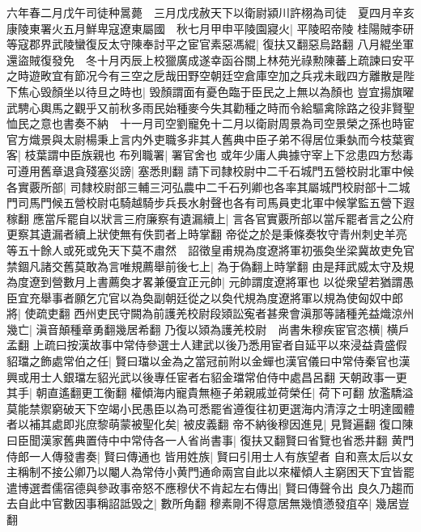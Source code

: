 六年春二月戊午司徒种暠薨　三月戊戌赦天下以衛尉潁川許栩為司徒　夏四月辛亥康陵東署火五月鮮卑寇遼東屬國　秋七月甲申平陵園寢火|{
	平陵昭帝陵}
桂陽賊李研等寇郡界武陵蠻復反太守陳奉討平之宦官素惡馮緄|{
	復扶又翻惡烏路翻}
八月緄坐軍還盜賊復發免　冬十月丙辰上校獵廣成遂幸函谷關上林苑光祿勲陳蕃上疏諫曰安平之時遊畋宜有節况今有三空之戹哉田野空朝廷空倉庫空加之兵戎未戢四方離散是陛下焦心毁顏坐以待旦之時也|{
	毁顏謂面有憂色臨于臣民之上無以為顏也}
豈宜揚旗曜武騁心輿馬之觀乎又前秋多雨民始種麥今失其勸種之時而令給驅禽除路之役非賢聖恤民之意也書奏不納　十一月司空劉寵免十二月以衛尉周景為司空景榮之孫也時宦官方熾景與太尉楊秉上言内外吏職多非其人舊典中臣子弟不得居位秉埶而今枝葉賓客|{
	枝葉謂中臣族親也}
布列職署|{
	署官舍也}
或年少庸人典據守宰上下忿患四方愁毒可遵用舊章退貪殘塞災謗|{
	塞悉則翻}
請下司隸校尉中二千石城門五營校尉北軍中候各實覈所部|{
	司隸校尉部三輔三河弘農中二千石列卿也各率其屬城門校尉部十二城門司馬門候五營校尉屯騎越騎步兵長水射聲也各有司馬員吏北軍中候掌監五營下遐稼翻}
應當斥罷自以狀言三府廉察有遺漏續上|{
	言各官實覈所部以當斥罷者言之公府更察其遺漏者續上狀使無有佚罰者上時掌翻}
帝從之於是秉條奏牧守青州刺史羊亮等五十餘人或死或免天下莫不肅然　詔徵皇甫規為度遼將軍初張奐坐梁冀故吏免官禁錮凡諸交舊莫敢為言唯規薦舉前後七上|{
	為于偽翻上時掌翻}
由是拜武威太守及規為度遼到營數月上書薦奐才畧兼優宜正元帥|{
	元帥謂度遼將軍也}
以從衆望若猶謂愚臣宜充舉事者願乞宂官以為奐副朝廷從之以奐代規為度遼將軍以規為使匈奴中郎將|{
	使疏吏翻}
西州吏民守闕為前護羌校尉段熲訟寃者甚衆會滇那等諸種羌益熾涼州幾亡|{
	滇音顛種章勇翻幾居希翻}
乃復以熲為護羌校尉　尚書朱穆疾宦官恣横|{
	横戶孟翻}
上疏曰按漢故事中常侍參選士人建武以後乃悉用宦者自延平以來浸益貴盛假貂璫之飾處常伯之任|{
	賢曰璫以金為之當冠前附以金蟬也漢官儀曰中常侍秦官也漢興或用士人銀璫左貂光武以後專任宦者右貂金璫常伯侍中處昌呂翻}
天朝政事一更其手|{
	朝直遙翻更工衡翻}
權傾海内寵貴無極子弟親戚並荷榮任|{
	荷下可翻}
放濫驕溢莫能禁禦窮破天下空竭小民愚臣以為可悉罷省遵復往初更選海内清淳之士明達國體者以補其處即兆庶黎萌蒙被聖化矣|{
	被皮義翻}
帝不納後穆因進見|{
	見賢遍翻}
復口陳曰臣聞漢家舊典置侍中中常侍各一人省尚書事|{
	復扶又翻賢曰省覽也省悉井翻}
黄門侍郎一人傳發書奏|{
	賢曰傳通也}
皆用姓族|{
	賢曰引用士人有族望者}
自和熹太后以女主稱制不接公卿乃以閹人為常侍小黄門通命兩宫自此以來權傾人主窮困天下宜皆罷遣博選耆儒宿德與參政事帝怒不應穆伏不肯起左右傳出|{
	賢曰傳聲令出}
良久乃趨而去自此中官數因事稱詔詆毁之|{
	數所角翻}
穆素剛不得意居無幾憤懣發疽卒|{
	幾居豈翻}


